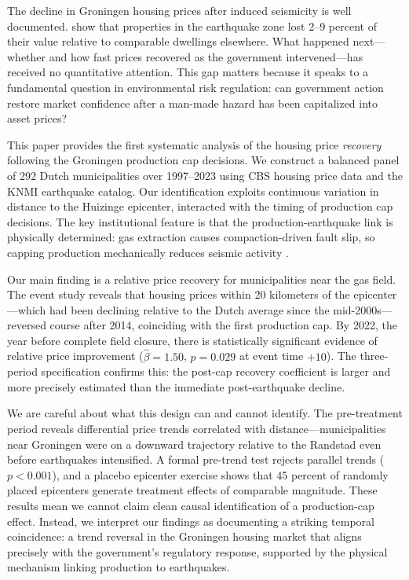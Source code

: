 \documentclass[12pt]{article}
\begin{document}
The decline in Groningen housing prices after induced seismicity is well documented. \citet{bosker2019} show that properties in the earthquake zone lost 2--9 percent of their value relative to comparable dwellings elsewhere. What happened next---whether and how fast prices recovered as the government intervened---has received no quantitative attention. This gap matters because it speaks to a fundamental question in environmental risk regulation: can government action restore market confidence after a man-made hazard has been capitalized into asset prices?

This paper provides the first systematic analysis of the housing price \textit{recovery} following the Groningen production cap decisions. We construct a balanced panel of 292 Dutch municipalities over 1997--2023 using CBS housing price data and the KNMI earthquake catalog. Our identification exploits continuous variation in distance to the Huizinge epicenter, interacted with the timing of production cap decisions. The key institutional feature is that the production-earthquake link is physically determined: gas extraction causes compaction-driven fault slip, so capping production mechanically reduces seismic activity \citep{vanThienenVisser2017, bourne2018}.

Our main finding is a relative price recovery for municipalities near the gas field. The event study reveals that housing prices within 20 kilometers of the epicenter---which had been declining relative to the Dutch average since the mid-2000s---reversed course after 2014, coinciding with the first production cap. By 2022, the year before complete field closure, there is statistically significant evidence of relative price improvement ($\hat{\beta} = 1.50$, $p = 0.029$ at event time $+10$). The three-period specification confirms this: the post-cap recovery coefficient is larger and more precisely estimated than the immediate post-earthquake decline.

We are careful about what this design can and cannot identify. The pre-treatment period reveals differential price trends correlated with distance---municipalities near Groningen were on a downward trajectory relative to the Randstad even before earthquakes intensified. A formal pre-trend test rejects parallel trends ($p < 0.001$), and a placebo epicenter exercise shows that 45 percent of randomly placed epicenters generate treatment effects of comparable magnitude. These results mean we cannot claim clean causal identification of a production-cap effect. Instead, we interpret our findings as documenting a striking temporal coincidence: a trend reversal in the Groningen housing market that aligns precisely with the government's regulatory response, supported by the physical mechanism linking production to earthquakes.
\end{document}
